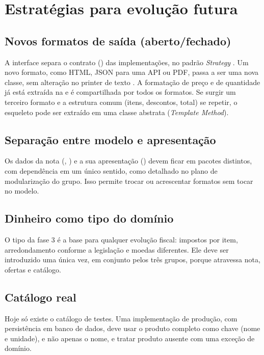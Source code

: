 \section{Estrat\'egias para evolu\c{c}\~ao futura}
\subsection{Novos formatos de sa\'ida (aberto/fechado)}
A interface  separa o contrato () das implementa\c{c}\~oes, no padr\~ao \textit{Strategy} \cite{gamma2000}. Um novo formato, como HTML, JSON para uma API ou PDF, passa a ser uma nova classe, sem altera\c{c}\~ao no printer de texto \cite{martin2011}. A formata\c{c}\~ao de pre\c{c}o e de quantidade j\'a est\'a extra\'ida na  e \'e compartilhada por todos os formatos. Se surgir um terceiro formato e a estrutura comum (itens, descontos, total) se repetir, o esqueleto pode ser extra\'ido em uma classe abstrata (\textit{Template Method}).

\subsection{Separa\c{c}\~ao entre modelo e apresenta\c{c}\~ao}
Os dados da nota (, ) e a sua apresenta\c{c}\~ao () devem ficar em pacotes distintos, com depend\^encia em um \'unico sentido, como detalhado no plano de modulariza\c{c}\~ao do grupo. Isso permite trocar ou acrescentar formatos sem tocar no modelo.

\subsection{Dinheiro como tipo do dom\'inio}
O tipo  da fase 3 \'e a base para qualquer evolu\c{c}\~ao fiscal: impostos por item, arredondamento conforme a legisla\c{c}\~ao e moedas diferentes. Ele deve ser introduzido uma \'unica vez, em conjunto pelos tr\^es grupos, porque atravessa nota, ofertas e cat\'alogo.

\subsection{Cat\'alogo real}
Hoje s\'o existe o cat\'alogo de testes. Uma implementa\c{c}\~ao de produ\c{c}\~ao, com persist\^encia em banco de dados, deve usar o produto completo como chave (nome e unidade), e n\~ao apenas o nome, e tratar produto ausente com uma exce\c{c}\~ao de dom\'inio.

